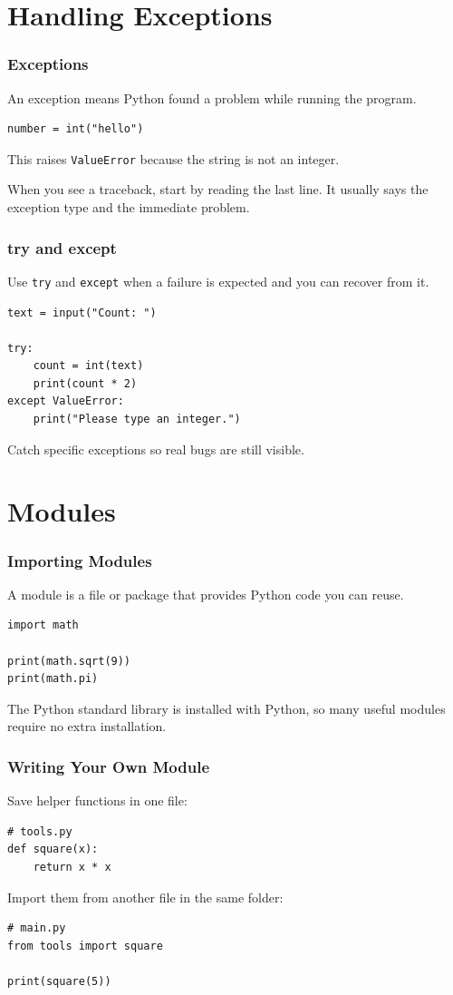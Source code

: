 \documentclass{beamer}
\begin{document}
	\section{Handling Exceptions}
	\begin{frame}[fragile]
		\frametitle{Exceptions}

		An exception means Python found a problem while running the program.
		\begin{lstlisting}
number = int("hello")
		\end{lstlisting}

		This raises \texttt{ValueError} because the string is not an integer.

		\medskip

		When you see a traceback, start by reading the last line. It usually says
		the exception type and the immediate problem.
	\end{frame}

	\begin{frame}[fragile]
		\frametitle{try and except}

		Use \texttt{try} and \texttt{except} when a failure is expected and you
		can recover from it.
		\begin{lstlisting}
text = input("Count: ")

try:
    count = int(text)
    print(count * 2)
except ValueError:
    print("Please type an integer.")
		\end{lstlisting}

		Catch specific exceptions so real bugs are still visible.
	\end{frame}

	\section{Modules}
	\begin{frame}[fragile]
		\frametitle{Importing Modules}

		A module is a file or package that provides Python code you can reuse.
		\begin{lstlisting}
import math

print(math.sqrt(9))
print(math.pi)
		\end{lstlisting}

		The Python standard library is installed with Python, so many useful
		modules require no extra installation.
	\end{frame}

	\begin{frame}[fragile]
		\frametitle{Writing Your Own Module}

		Save helper functions in one file:
		\begin{lstlisting}
# tools.py
def square(x):
    return x * x
		\end{lstlisting}

		Import them from another file in the same folder:
		\begin{lstlisting}
# main.py
from tools import square

print(square(5))
		\end{lstlisting}
	\end{frame}
\end{document}
